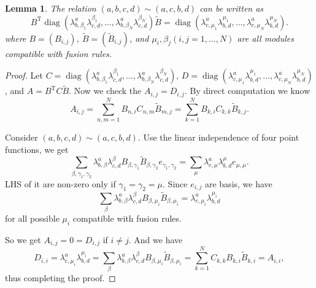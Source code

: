 \documentclass{article}
\newtheorem{lemma}{Lemma}[section]
\begin{document}
\begin{lemma}
The relation $(a,b,c,d)\sim(a,c,b,d)$
can be written as
\begin{equation}\label{braid matrix and lambda}
B^{\operatorname{T}}\operatorname{diag}\left(\lambda_{b,\beta_1}^a\lambda_{c,d}^{\beta_1},\ldots,\lambda_{b,\beta_N}^a\lambda_{c,d}^{\beta_N}\right)\tilde{B}
=\operatorname{diag}\left(\lambda_{c,\mu_1}^a\lambda_{b,d}^{\mu_1},\ldots,\lambda_{c,\mu_N}^a\lambda_{b,d}^{\mu_N}\right). 
\end{equation}
where $B=\left(B_{i,j}\right)$,
$\tilde{B}=\left(\tilde{B}_{i,j}\right)$,
and $\mu_i, \beta_j \left(i,j=1,\ldots,N\right)$ are all modules compatible with fusion rules.
\end{lemma}
\begin{proof}
Let $C=\operatorname{diag}\left(\lambda_{b,\beta_1}^a\lambda_{c,d}^{\beta_1},\ldots,\lambda_{b,\beta_N}^a\lambda_{c,d}^{\beta_N}\right)$,
$D=\operatorname{diag}\left(\lambda_{c,\mu_1}^a\lambda_{b,d}^{\mu_1},\ldots,\lambda_{c,\mu_N}^a\lambda_{b,d}^{\mu_N}\right)$,
and $A=B^{\operatorname{T}}C\tilde{B}$.
Now we check the $A_{i,j}=D_{i,j}$.
By direct computation we know
$$A_{i,j}=\sum_{n,m=1}^N B_{n,i}C_{n,m}\tilde{B}_{m,j}=\sum_{k=1}^N B_{k,i}C_{k,k}\tilde{B}_{k,j}.$$ 

Consider $(a,b,c,d)\sim(a,c,b,d)$.
Use the linear independence of four point functions,
we get 
$$
\sum_{\beta,\gamma_1,\gamma_2}\lambda_{b,\beta}^a\lambda_{c,d}^{\beta}
B_{\beta,\gamma_1}\tilde{B}_{\beta,\gamma_2}
e_{\gamma_1,\gamma_2}
=\sum_{\mu}\lambda_{c,\mu}^a\lambda_{b,d}^{\mu} 
e_{\mu,\mu}.
$$
LHS of it are non-zero only if $\gamma_1=\gamma_2=\mu$.
Since $e_{i,j}$ are basis,
we have 
\begin{equation}\label{DJY equations}
	\sum_{\beta}\lambda_{b,\beta}^a\lambda_{c,d}^{\beta}B_{\beta,\mu_i}\tilde{B}_{\beta,\mu_i}
=\lambda_{c,\mu_i}^a\lambda_{b,d}^{\mu_i}
\end{equation}
for all possible $\mu_i$ compatible with fusion rules.

So we get $A_{i,j}=0=D_{i,j}$ if $i\neq j$.
And we have
$$D_{i,i}=\lambda_{c,\mu_i}^a\lambda_{b,d}^{\mu_i}
=\sum_{\beta}\lambda_{b,\beta}^a\lambda_{c,d}^{\beta}B_{\beta,\mu_i}\tilde{B}_{\beta,\mu_i}
=\sum_{k=1}^N C_{k,k}B_{k,i}\tilde{B}_{k,i}=A_{i,i},$$
thus completing the proof.
\end{proof}
\end{document}
